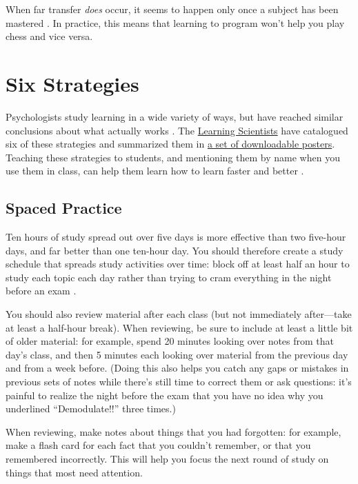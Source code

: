 When far transfer \emph{does} occur, it seems to happen only once a subject
has been mastered \cite{Gick1987}. In practice, this means that
learning to program won't help you play chess and vice versa.

\section{Six Strategies}\label{s:individual-strategies}

Psychologists study learning in a wide variety of ways, but have
reached similar conclusions about what actually works
\cite{Mark2018}. The \href{http://www.learningscientists.org/}{Learning Scientists}
have catalogued six of these strategies and summarized them in \href{http://www.learningscientists.org/downloadable-materials}{a set
of downloadable posters}. Teaching
these strategies to students, and mentioning them by name when you use
them in class, can help them learn how to learn faster and better
\cite{Wein2018a}.

\subsection{Spaced Practice}\label{spaced-practice}

Ten hours of study spread out over five days is more effective than two
five-hour days, and far better than one ten-hour day. You should
therefore create a study schedule that spreads study activities over
time: block off at least half an hour to study each topic each day
rather than trying to cram everything in the night before an exam
\cite{Kang2016}.

You should also review material after each class (but not immediately
after---take at least a half-hour break). When reviewing, be sure to
include at least a little bit of older material: for example, spend 20
minutes looking over notes from that day's class, and then 5 minutes
each looking over material from the previous day and from a week before.
(Doing this also helps you catch any gaps or mistakes in previous sets
of notes while there's still time to correct them or ask questions: it's
painful to realize the night before the exam that you have no idea why
you underlined ``Demodulate!!'' three times.)

When reviewing, make notes about things that you had forgotten: for
example, make a flash card for each fact that you couldn't remember, or
that you remembered incorrectly. This will help you focus the next round
of study on things that most need attention.

